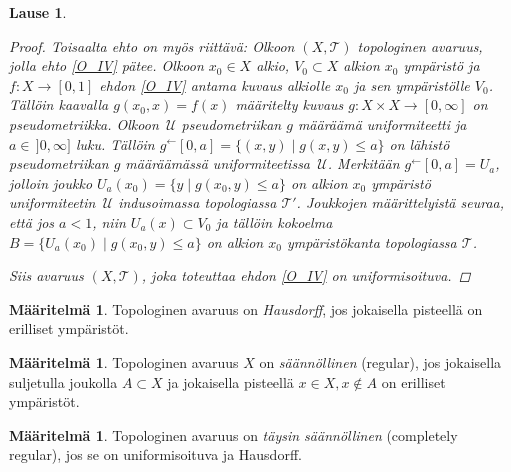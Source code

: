 \documentclass[12pt,a4paper,leqno]{report}
\newcommand{\U}{\,\mathcal{U}}
\newcommand{\T}{\mathcal{T}}
\theoremstyle{plain}
\newtheorem{lause}[equation]{Lause}
\theoremstyle{definition}
\newtheorem{maar}[equation]{Määritelmä}
\theoremstyle{remark}
\begin{document}
\begin{lause}
\begin{proof}
Toisaalta ehto on myös riittävä:
Olkoon $(X,\T)$ topologinen avaruus, jolla ehto \ref{O_IV} pätee. 
Olkoon $x_0\in X$ alkio, $V_0\subset X$ alkion $x_0$ ympäristö 
ja $f\colon X\rightarrow [0,1]$ ehdon \ref{O_IV} antama kuvaus alkiolle $x_0$ ja sen ympäristölle $V_0$. 
Tällöin kaavalla $g(x_0,x)=f(x)$ määritelty kuvaus $g\colon X\times X\to [0,\infty]$ on pseudometriikka. 
Olkoon $\U$ pseudometriikan $g$ määräämä uniformiteetti ja 
$ a\in \,]0,\infty]$ luku. 
Tällöin $g^\leftarrow[0,a]=\{(x,y)\mid g(x,y)\leq a\}$ on 
lähistö pseudometriikan $g$ määräämässä uniformiteetissa $\U$. 
Merkitään $g^\leftarrow[0,a]=U_a$, jolloin  
joukko $U_a(x_0)=\{y\mid g(x_0,y)\leq a\}$ on alkion $x_0$ ympäristö uniformiteetin $\U$ 
indusoimassa topologiassa $\T'$. 
Joukkojen määrittelyistä seuraa, että jos $a<1$, niin $U_a(x)\subset V_0$ ja tällöin kokoelma $B=\{U_a(x_0)\mid g(x_0,y)\leq a\}$ 
on alkion $x_0$ ympäristökanta topologiassa $\T$.
%

Siis avaruus $(X,\T)$, joka toteuttaa ehdon \ref{O_IV} on uniformisoituva.
\end{proof}
\end{lause}

\begin{maar}
Topologinen avaruus on \emph{Hausdorff}, jos jokaisella pisteellä on erilliset ympäristöt.
\end{maar}

\begin{maar}
Topologinen avaruus $X$ on \emph{säännöllinen} (regular), 
jos jokaisella suljetulla joukolla $A\subset X$ ja jokaisella pisteellä $x\in X,x\not\in A$ on erilliset ympäristöt.
\end{maar}

\begin{maar}
Topologinen avaruus on \emph{täysin säännöllinen} (completely regular), 
jos se on uniformisoituva ja Hausdorff.
\end{maar}
\end{document}
